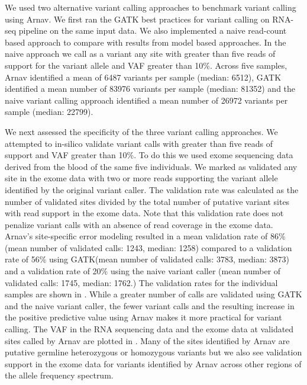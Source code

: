 We used two alternative variant calling approaches to benchmark variant calling using Arnav. We first ran the GATK best practices for variant calling on RNA-seq pipeline \cite{depristo2011ng} \cite{vanderauwera2013cpb} on the same input data. We also implemented a naive read-count based approach to compare with results from model based approaches. In the naive approach we call as a variant any site with greater than five reads of support for the variant allele and VAF greater than 10\%. Across five samples, Arnav identified a mean of 6487 variants per sample (median: 6512), GATK identified a mean number of 83976 variants per sample (median: 81352) and the naive variant calling approach identified a mean number of 26972 variants per sample (median: 22799).

We next assessed the specificity of the three variant calling approaches. We attempted to in-silico validate variant calls with greater than five reads of support and VAF greater than 10\%. To do this we used exome sequencing data derived from the blood of the same five individuals. We marked as validated any site in the exome data with two or more reads supporting the variant allele identified by the original variant caller. The validation rate was calculated as the number of validated sites divided by the total number of putative variant sites with read support in the exome data. Note that this validation rate does not penalize variant calls with an absence of read coverage in the exome data. Arnav’s site-specific error modeling resulted in a mean validation rate of 86\% (mean number of validated calls: 1243, median: 1258) compared to a validation rate of 56\% using GATK(mean number of validated calls: 3783, median: 3873) and a validation rate of 20\% using the naive variant caller (mean number of validated calls: 1745, median: 1762.) The validation rates for the individual samples are shown in . While a greater number of calls are validated using GATK and the naive variant caller, the fewer variant calls and the resulting increase in the positive predictive value using Arnav makes it more practical for variant calling. The VAF in the RNA sequencing data and the exome data at validated sites called by Arnav are plotted in . Many of the sites identified by Arnav are putative germline heterozygous or homozygous variants but we also see validation support in the exome data for variants identified by Arnav across other regions of the allele frequency spectrum.

